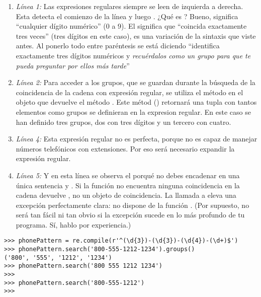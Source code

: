 \begin{enumerate}

\item \emph{Línea 1:} Las expresiones regulares siempre se leen de izquierda a derecha. Esta detecta el comienzo de la línea y luego . ¿Qué es ? Bueno,  significa ``cualquier dígito numérico'' (0 a 9). El  significa que ``coincida exactamente tres veces'' (tres dígitos en este caso), es una variación de la sintaxis  que viste antes. Al ponerlo todo entre paréntesis se está diciendo ``identifica exactamente tres dígitos numéricos y \emph{recuérdalos como un grupo para que te pueda preguntar por ellos más tarde}''

\item \emph{Línea 2:} Para acceder a los grupos, que se guardan durante la búsqueda de la coincidencia de la cadena con expresión regular, se utiliza el método  en el objeto que devuelve el método . Este métod () retornará una tupla con tantos elementos como grupos se definieran en la expresion regular. En este caso se han definido tres grupos, dos con tres dígitos y un tercero con cuatro.

\item \emph{Línea 4:} Esta expresión regular no es perfecta, porque no es capaz de manejar números telefónicos con extensiones. Por eso será necesario expandir la expresión regular.
 
\item \emph{Línea 5:} Y en esta línea se observa el porqué no debes encadenar en una única sentencia  y . Si la función  no encuentra ninguna coincidencia en la cadena devuelve , no un objeto de coincidencia. La llamada a  eleva una excepción perfectamente clara:  no dispone de la función . (Por supuesto, no será tan fácil ni tan obvio si la excepción sucede en lo más profundo de tu programa. Sí, hablo por experiencia.)

\end{enumerate}

\noindent\begin{minipage}{\textwidth}
\begin{lstlisting}[mathescape=False]
>>> phonePattern = re.compile(r'^(\d{3})-(\d{3})-(\d{4})-(\d+)$')
>>> phonePattern.search('800-555-1212-1234').groups()
('800', '555', '1212', '1234')
>>> phonePattern.search('800 555 1212 1234')
>>> 
>>> phonePattern.search('800-555-1212')
>>> 
\end{lstlisting}
\end{minipage}

